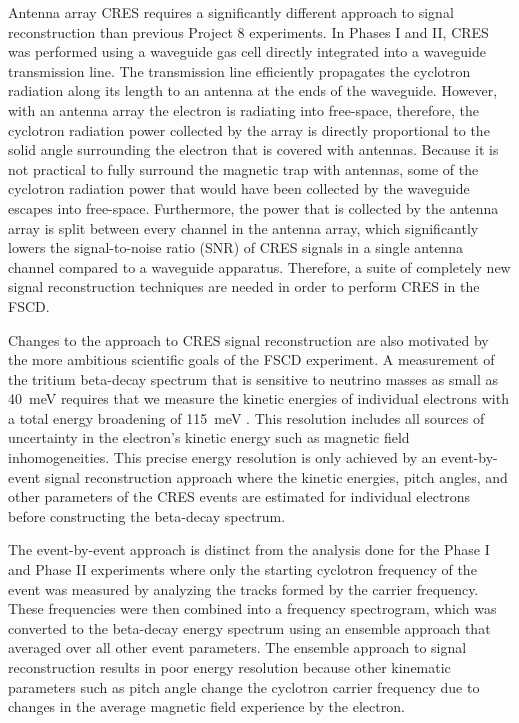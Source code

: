Antenna array CRES requires a significantly different approach to signal reconstruction than previous Project 8 experiments. In Phases I and II, CRES was performed using a waveguide gas cell directly integrated into a waveguide transmission line. The transmission line efficiently propagates the cyclotron radiation along its length to an antenna at the ends of the waveguide. However, with an antenna array the electron is radiating into free-space, therefore, the cyclotron radiation power collected by the array is directly proportional to the solid angle surrounding the electron that is covered with antennas. Because it is not practical to fully surround the magnetic trap with antennas, some of the cyclotron radiation power that would have been collected by the waveguide escapes into free-space. Furthermore, the power that is collected by the antenna array is split between every channel in the antenna array, which significantly lowers the signal-to-noise ratio (SNR) of CRES signals in a single antenna channel compared to a waveguide apparatus. Therefore, a suite of completely new signal reconstruction techniques are needed in order to perform CRES in the FSCD.

Changes to the approach to CRES signal reconstruction are also motivated by the more ambitious scientific goals of the FSCD experiment. A measurement of the tritium beta-decay spectrum that is sensitive to neutrino masses as small as 40~meV requires that we measure the kinetic energies of individual electrons with a total energy broadening of 115~meV \cite{p8bayesian}. This resolution includes all sources of uncertainty in the electron's kinetic energy such as magnetic field inhomogeneities. This precise energy resolution is only achieved by an event-by-event signal reconstruction approach where the kinetic energies, pitch angles, and other parameters of the CRES events are estimated for individual electrons before constructing the beta-decay spectrum. 

The event-by-event approach is distinct from the analysis done for the Phase I and Phase II experiments where only the starting cyclotron frequency of the event was measured by analyzing the tracks formed by the carrier frequency. These frequencies were then combined into a frequency spectrogram, which was converted to the beta-decay energy spectrum using an ensemble approach that averaged over all other event parameters. The ensemble approach to signal reconstruction results in poor energy resolution because other kinematic parameters such as pitch angle change the cyclotron carrier frequency due to changes in the average magnetic field experience by the electron.

